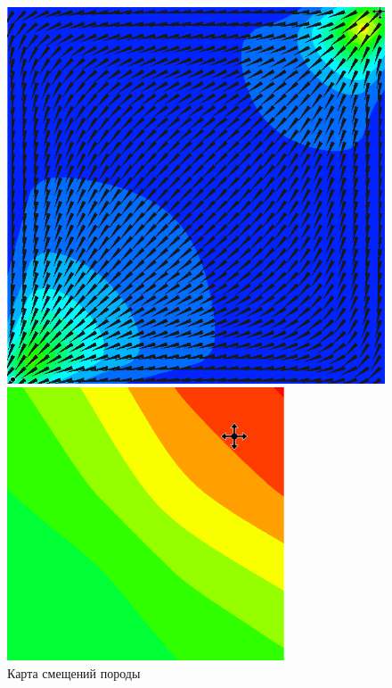 \documentclass[11pt,twoside]{article}
\begin{document}
\begin{figure}[h!]
\begin{minipage}{0.35\linewidth}
\includegraphics[width=1\linewidth]{displacements.png}
\caption{Карта смещений породы}
\label{displacements}
\end{minipage}
\hfill
\begin{minipage}{0.3\linewidth}
\includegraphics[width=1\linewidth]{injection.png}

\end{minipage}
\end{figure}
\end{document}
